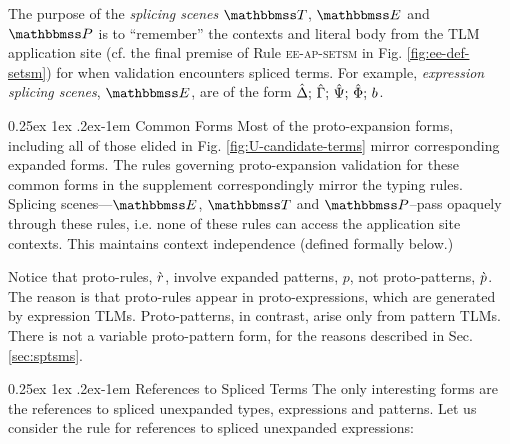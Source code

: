 \documentclass[acmsmall,review,anonymous]{acmart}\settopmatter{printfolios=true,printccs=false,printacmref=false}
\makeatletter
\renewcommand{\paragraph}{%
  \@startsection{paragraph}{4}%
  {\z@}{0.25ex \@plus 1ex \@minus .2ex}{-1em}%
  {\normalfont\normalsize\bfseries}%
}
\makeatother
\begin{document}
The purpose of the \emph{splicing scenes} $\tscenev$, $\escenev$ and $\pscenev$ is to ``remember'' the contexts and literal body from the TLM application site (cf. the final premise of Rule \textsc{ee-ap-setsm} in Fig. \ref{fig:ee-def-setsm}) for when validation encounters spliced terms. For example, \emph{expression splicing scenes}, $\escenev$, are of the form $\esceneUP{\uDelta}{\uGamma}{\uPsi}{\uPhi}{b}$.

\paragraph{Common Forms} Most of the proto-expansion forms, including all of those elided in Fig. \ref{fig:U-candidate-terms} mirror corresponding expanded forms. The rules governing proto-expansion validation for these common forms  in the supplement correspondingly mirror the typing rules. Splicing scenes---$\escenev$, $\tscenev$ and $\pscenev$--pass opaquely through these rules, i.e. none of these rules can access the application site contexts. This maintains context independence (defined formally below.)

Notice that proto-rules, $\crv$, involve expanded patterns, $p$, not proto-patterns, $\cpv$. The reason is that proto-rules appear in proto-expressions, which are generated by expression TLMs. Proto-patterns, in contrast, arise only from pattern TLMs. There is not a variable proto-pattern form, for the reasons described in Sec. \ref{sec:sptsms}.

\paragraph{References to Spliced Terms} The only interesting forms are the references to spliced unexpanded types, expressions and patterns. Let us consider the rule for references to spliced unexpanded expressions:
{\small\begin{mathpar}
\end{mathpar}}
\end{document}
